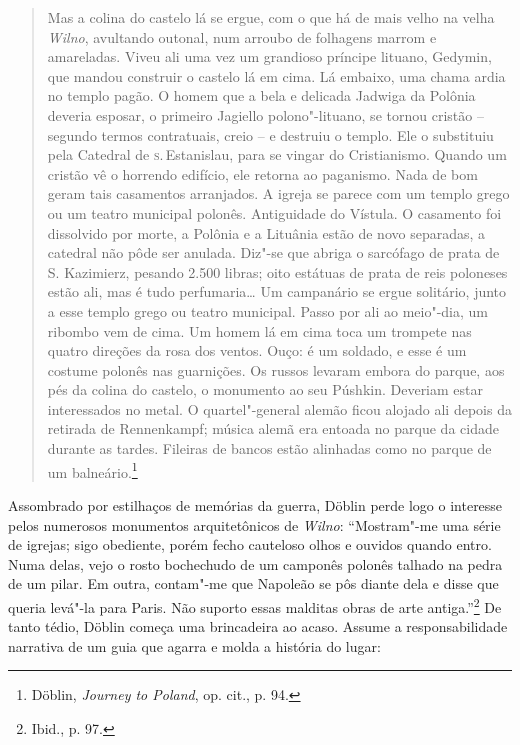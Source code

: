 \begin{quote}
Mas a colina do castelo lá se ergue, com o que há de mais velho na velha
\textit{Wilno}, avultando outonal, num arroubo de folhagens marrom e amareladas.
Viveu ali uma vez um grandioso príncipe lituano, Gedymin, que mandou
construir o castelo lá em cima. Lá embaixo, uma chama ardia no templo
pagão. O homem que a bela e delicada Jadwiga da Polônia deveria esposar,
o primeiro Jagiello polono"-lituano, se tornou cristão -- segundo termos
contratuais, creio -- e destruiu o templo. Ele o substituiu pela Catedral
de \textsc{s}.\,Estanislau, para se vingar do Cristianismo. Quando um cristão vê o
horrendo edifício, ele retorna ao paganismo. Nada de bom geram tais
casamentos arranjados. A igreja se parece com um templo grego ou um
teatro municipal polonês. Antiguidade do Vístula. O casamento foi
dissolvido por morte, a Polônia e a Lituânia estão de novo separadas, a
catedral não pôde ser anulada. Diz"-se que abriga o sarcófago de prata de
S. Kazimierz, pesando 2.500 libras; oito estátuas de
prata de reis poloneses estão ali, mas é tudo perfumaria\ldots{} Um
campanário se ergue solitário, junto a esse templo grego ou teatro
municipal. Passo por ali ao meio"-dia, um ribombo vem de cima. Um homem
lá em cima toca um trompete nas quatro direções da rosa dos ventos.
Ouço: é um soldado, e esse é um costume polonês nas guarnições. Os
russos levaram embora do parque, aos pés da colina do castelo, o
monumento ao seu Púshkin. Deveriam estar interessados no metal. O
quartel"-general alemão ficou alojado ali depois da retirada de
Rennenkampf; música alemã era entoada no parque da cidade durante as
tardes. Fileiras de bancos estão alinhadas como no parque de um
balneário.\footnote{Döblin, \textit{Journey to Poland}, op. cit., p. 94.}
\end{quote}

Assombrado por estilhaços de memórias da guerra, Döblin perde logo o
interesse pelos numerosos monumentos arquitetônicos de \textit{Wilno}:
``Mostram"-me uma série de igrejas; sigo obediente, porém fecho cauteloso
olhos e ouvidos quando entro. Numa delas, vejo o rosto bochechudo de um
camponês polonês talhado na pedra de um pilar. Em outra, contam"-me que
Napoleão se pôs diante dela e disse que queria levá"-la para Paris. Não
suporto essas malditas obras de arte antiga.''\footnote{Ibid., p. 97.}
De tanto tédio, Döblin começa uma brincadeira ao acaso. Assume a
responsabilidade narrativa de um guia que agarra e molda a história do
lugar:


